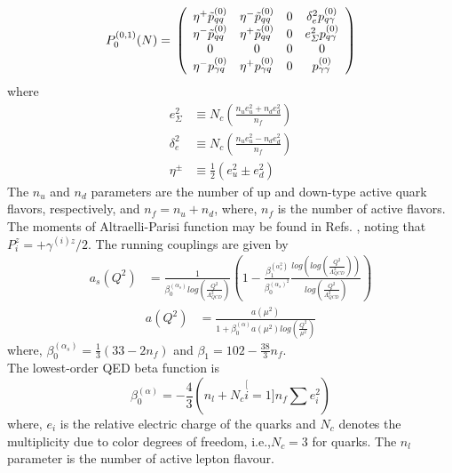 \documentclass[review]{elsarticle}
\begin{document}
\begin{equation}
P_{0}^{(0,1)}(N)=\\
\left(\begin{array}{cccc}
\eta^+\tilde{p}_{qq}^{(0)} & \eta^-\tilde{p}_{qq}^{(0)} & 0 & \delta_{e}^{2} p_{q\gamma}^{(0)}\\
\eta^-\tilde{p}_{qq}^{(0)} & \eta^+\tilde{p}_{qq}^{(0)} & 0 & e_{\varSigma}^{2} p_{q\gamma}^{(0)}\\
0 & 0 & 0 & 0\\
\eta^- p_{\gamma q}^{(0)} & \eta^+ p_{\gamma q}^{(0)} & 0 & p_{\gamma\gamma}^{(0)}
\end{array}\right)
\end{equation}
where 
\begin{align*}
e_{\varSigma}^{2} & \equiv N_{c}(\frac{n_{u}e_{u}^{2}+n_{d}e_{d}^{2}}{n_{f}})\\
\delta_{e}^{2} & \equiv N_{c}(\frac{n_{u}e_{u}^{2}-n_{d}e_{d}^{2}}{n_{f}})\\
\eta^{\pm} & \equiv\frac{1}{2}(e_u^2\pm e_d^2)
\end{align*}
The $n_{u}$ and $n_{d}$ parameters are the number of up and down-type active
quark flavors, respectively, and $n_{f}=n_{u}+n_{d}$, where, $n_{f}$ is the number of active flavors. The moments of Altraelli-Parisi function may be found in Refs. \cite{Roth:2004ti,Floratos:1978ny,Floratos:1977au,GonzalezArroyo:1979df,GonzalezArroyo:1979he,Floratos:1981hs,Furmanski:1981cw,Curci:1980uw,Hamberg:1991qt,Moch:1999eb}, noting that $P_{i}^{z}=+\gamma^{(i)z}/2$.
The running couplings are given by
\begin{eqnarray}
a_{s}(Q^{2}) & =\frac{1}{\beta_{0}^{(\alpha_s)}log(\frac{Q^{2}}{\Lambda_{QCD}^{2}})}(1-\frac{\beta_{1}^{(\alpha_s^2)}}{\beta_{0}^{(\alpha_s)^{2}}}\frac{log(log(\frac{Q^{2}}{\Lambda_{QCD}^{2}}))}{log(\frac{Q^{2}}{\Lambda_{QCD}^{2}})})\label{eq:9}
\end{eqnarray}
\begin{eqnarray}
a(Q^{2}) & =\frac{a(\mu^{2})}{1+\beta_{0}^{(\alpha)}a(\mu^{2})log(\frac{Q^{2}}{\mu^{2}})}\label{eq:10}
\end{eqnarray}
where, $\beta_{0}^{(\alpha_s)}=\frac{1}{3}(33-2n_{f})$ and $\beta_{1}=102-\frac{38}{3}n_{f}$.
\\The lowest-order QED beta function is
\begin{equation}
\beta_{0}^{(\alpha)}=-\frac{4}{3}(n_{l}+N_{c}\stackrel[i=1]{n_{f}}{\sum}e_{i}^{2})
\end{equation}
where, $e_{i}$ is the relative electric charge of the quarks and
$N_{c}$ denotes the multiplicity due to color degrees of freedom,
i.e.,$N_{c}=3$ for quarks. The $n_{l}$ parameter is the number of active lepton flavour.
\end{document}
